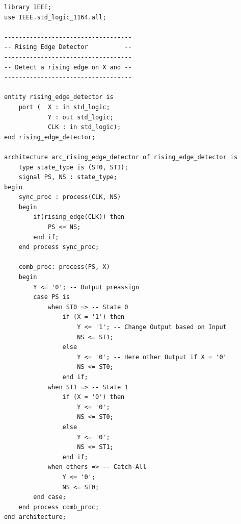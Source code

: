 \documentclass[a4paper,10pt]{IEEEtran}
\begin{document}
\begin{lstlisting}[caption={Example VHDL solution for Figure \ref{fig:mealy_edge}}, label={lst:mealy_rising_edge_detector}]
library IEEE;
use IEEE.std_logic_1164.all;

-----------------------------------
-- Rising Edge Detector          -- 
-----------------------------------
-- Detect a rising edge on X and -- 
-----------------------------------

entity rising_edge_detector is
    port (  X : in std_logic;
            Y : out std_logic;
            CLK : in std_logic);
end rising_edge_detector;

architecture arc_rising_edge_detector of rising_edge_detector is
    type state_type is (ST0, ST1);
    signal PS, NS : state_type;
begin
    sync_proc : process(CLK, NS)
    begin
        if(rising_edge(CLK)) then
            PS <= NS;
        end if;
    end process sync_proc;

    comb_proc: process(PS, X)
    begin
        Y <= '0'; -- Output preassign
        case PS is
            when ST0 => -- State 0
                if (X = '1') then 
                    Y <= '1'; -- Change Output based on Input
                    NS <= ST1;
                else 
                    Y <= '0'; -- Here other Output if X = '0'
                    NS <= ST0;
                end if;
            when ST1 => -- State 1
                if (X = '0') then
                    Y <= '0'; 
                    NS <= ST0;
                else 
                    Y <= '0';
                    NS <= ST1;
                end if;
            when others => -- Catch-All
                Y <= '0';
                NS <= ST0;
        end case;
    end process comb_proc;
end architecture;
\end{lstlisting}



\end{document}
